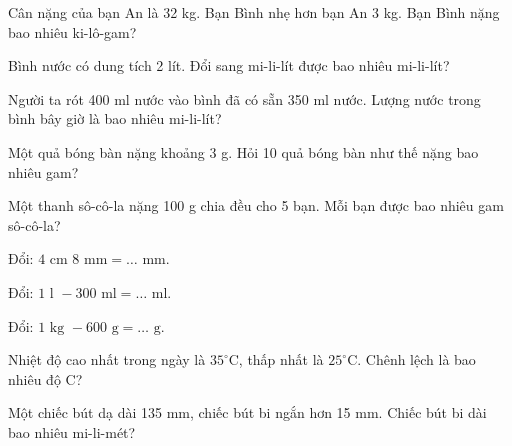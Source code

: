 \begin{ex}
Cân nặng của bạn An là 32 kg. Bạn Bình nhẹ hơn bạn An 3 kg. Bạn Bình nặng bao nhiêu ki-lô-gam?
\end{ex}

\begin{ex}
Bình nước có dung tích 2 lít. Đổi sang mi-li-lít được bao nhiêu mi-li-lít?
\end{ex}

\begin{ex}
Người ta rót 400 ml nước vào bình đã có sẵn 350 ml nước. Lượng nước trong bình bây giờ là bao nhiêu mi-li-lít?
\end{ex}

\begin{ex}
Một quả bóng bàn nặng khoảng 3 g. Hỏi 10 quả bóng bàn như thế nặng bao nhiêu gam?
\end{ex}

\begin{ex}
Một thanh sô-cô-la nặng 100 g chia đều cho 5 bạn. Mỗi bạn được bao nhiêu gam sô-cô-la?
\end{ex}

\begin{ex}
Đổi: $4\text{ cm } 8\text{ mm} = \dots\text{ mm}$.
\end{ex}

\begin{ex}
Đổi: $1\text{ l } - 300\text{ ml} = \dots\text{ ml}$.
\end{ex}

\begin{ex}
Đổi: $1\text{ kg } - 600\text{ g} = \dots\text{ g}$.
\end{ex}

\begin{ex}
Nhiệt độ cao nhất trong ngày là $35^\circ$C, thấp nhất là $25^\circ$C. Chênh lệch là bao nhiêu độ C?
\end{ex}

\begin{ex}
Một chiếc bút dạ dài 135 mm, chiếc bút bi ngắn hơn 15 mm. Chiếc bút bi dài bao nhiêu mi-li-mét?
\end{ex}


